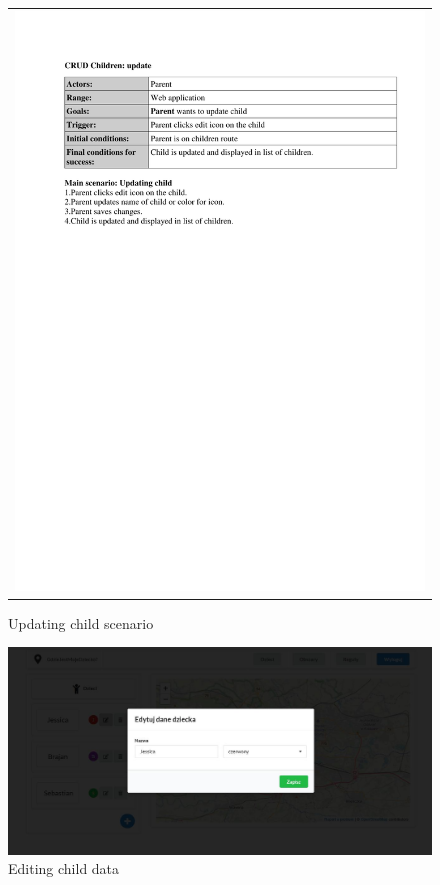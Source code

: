 \documentclass{sprawozdanie-agh}
\begin{document}
		\begin{figure}[H] 
			\centering
			\begin{tabular}{c}
				\includegraphics[width=.80\textwidth]{childrenUpdate} 
			\end{tabular} 
		\caption{Updating child scenario}
		\end{figure}

		\begin{figure}[H]
			\centering
			\includegraphics[width=.80\textwidth]{editChild}
			\caption{Editing child data}
		\end{figure}
\end{document}
